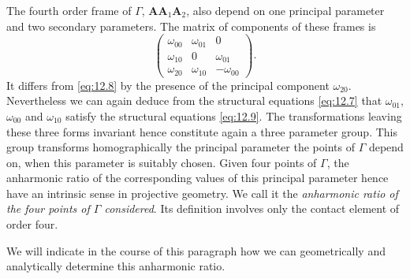 \documentclass[leqno,11pt]{book}
\numberwithin{equation}{chapter}
\theoremstyle{shape1}
\theoremstyle{shapesmall}
\begin{document}
The fourth order frame of $\Gamma$, $\mathbf{AA}_{1}\mathbf{A}_{2}$, also depend on one principal parameter and two secondary parameters. The matrix of components of these frames is
\[
\begin{pmatrix}
  \omega_{00}&\omega_{01}&0\\
  \omega_{10}&0&\omega_{01}\\
  \omega_{20}&\omega_{10}&-\omega_{00}
\end{pmatrix}.
\]
It differs from \eqref{eq:12.8} by the presence of the principal component $\omega_{20}$. Nevertheless we can again deduce from the structural equations \eqref{eq:12.7} that $\omega_{01}$, $\omega_{00}$ and $\omega_{10}$ satisfy the structural equations \eqref{eq:12.9}. The transformations leaving these three forms invariant hence constitute again a three parameter group. This group transforms homographically the principal parameter the points of $\Gamma$ depend on, when this parameter is suitably chosen. Given four points of $\Gamma$, the anharmonic ratio of the corresponding values of this principal parameter hence have an intrinsic sense in projective geometry. We call it the \emph{anharmonic ratio of the four points of $\Gamma$ considered}. Its definition involves only the contact element of order four.

We will indicate in the course of this paragraph how we can geometrically and analytically determine this anharmonic ratio.
\end{document}
